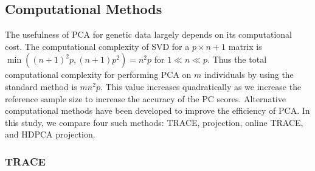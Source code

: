 \documentclass{article}[12pt]
\begin{document}
\subsection{Computational Methods}

The usefulness of PCA for genetic data largely depends on its computational cost.
The computational complexity of SVD for a $p \times n+1$ matrix is $\min((n+1)^2p, (n+1)p^2) = n^2p $ for $1 \ll n \ll p$.
Thus the total computational complexity for performing PCA on $m$ individuals by using the standard method is $mn^2p$.
This value increases quadratically as we increase the reference sample size to increase the accuracy of the PC scores.
Alternative computational methods have been developed to improve the efficiency of PCA.
In this study, we compare four such methods: TRACE, projection, online TRACE, and HDPCA projection.

\subsubsection{TRACE}
\end{document}

